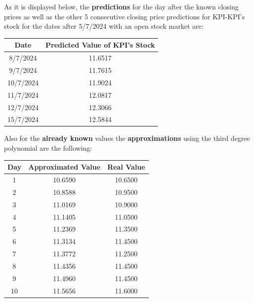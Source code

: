 \documentclass{article}
\begin{document}
\begin{itemize}
As it is displayed below, the \textbf{predictions} for the day after the known closing prices as well as the other 5 consecutive closing price predictions for KPI-KPI's stock for the dates after 5/7/2024 with an open stock market are:
\begin{center}
    \begin{tabular}{|c|c|}
        \hline
        \textbf{Date} & \textbf{Predicted Value of KPI's Stock} \\
        \hline
        8/7/2024 & 11.6517 \\
        9/7/2024 & 11.7615 \\
        10/7/2024 & 11.9024 \\
        11/7/2024 & 12.0817 \\
        12/7/2024 & 12.3066 \\
        15/7/2024 & 12.5844 \\
        \hline
    \end{tabular}
\end{center}

Also for the \textbf{already known} values the \textbf{approximations} using the third degree polynomial are the following:
\begin{center}
    

    \begin{tabular}{@{}ccc@{}}
        \toprule
        \textbf{Day} & \textbf{Approximated Value} & \textbf{Real Value} \\ \midrule
        1 & 10.6590 & 10.6500 \\
        2 & 10.8588 & 10.9500 \\
        3 & 11.0169 & 10.9000 \\
        4 & 11.1405 & 11.0500 \\
        5 & 11.2369 & 11.3500 \\
        6 & 11.3134 & 11.4500 \\
        7 & 11.3772 & 11.2500 \\
        8 & 11.4356 & 11.4500 \\
        9 & 11.4960 & 11.4500 \\
        10 & 11.5656 & 11.6000 \\
        \bottomrule
    \end{tabular}


\end{center}
\end{itemize}
\end{document}

